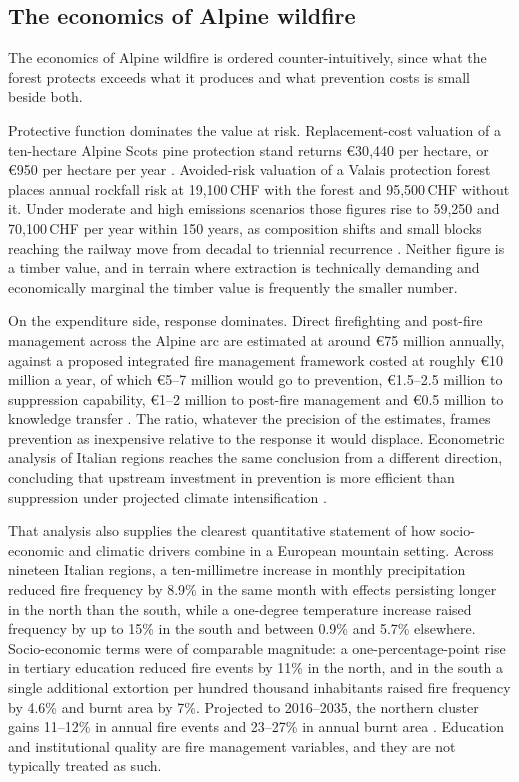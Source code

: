 \documentclass[11pt,a4paper]{article}
\begin{document}
\subsection{The economics of Alpine wildfire}
\label{sec:economics}

The economics of Alpine wildfire is ordered counter-intuitively, since what the forest protects exceeds what it produces and what prevention costs is small beside both.

Protective function dominates the value at risk. Replacement-cost valuation of a ten-hectare Alpine Scots pine protection stand returns €30{,}440 per hectare, or €950 per hectare per year \citep{accastello_asforesee_2019}. Avoided-risk valuation of a Valais protection forest places annual rockfall risk at 19{,}100\,CHF with the forest and 95{,}500\,CHF without it. Under moderate and high emissions scenarios those figures rise to 59{,}250 and 70{,}100\,CHF per year within 150 years, as composition shifts and small blocks reaching the railway move from decadal to triennial recurrence \citep{moos_climate_2021}. Neither figure is a timber value, and in terrain where extraction is technically demanding and economically marginal \citep{dinca_timber_2025} the timber value is frequently the smaller number.

On the expenditure side, response dominates. Direct firefighting and post-fire management across the Alpine arc are estimated at around €75 million annually, against a proposed integrated fire management framework costed at roughly €10 million a year, of which €5--7 million would go to prevention, €1.5--2.5 million to suppression capability, €1--2 million to post-fire management and €0.5 million to knowledge transfer \citep{muller_forest_2020}. The ratio, whatever the precision of the estimates, frames prevention as inexpensive relative to the response it would displace. Econometric analysis of Italian regions reaches the same conclusion from a different direction, concluding that upstream investment in prevention is more efficient than suppression under projected climate intensification \citep{michetti_forest_2019}.

That analysis also supplies the clearest quantitative statement of how socio-economic and climatic drivers combine in a European mountain setting. Across nineteen Italian regions, a ten-millimetre increase in monthly precipitation reduced fire frequency by 8.9\% in the same month with effects persisting longer in the north than the south, while a one-degree temperature increase raised frequency by up to 15\% in the south and between 0.9\% and 5.7\% elsewhere. Socio-economic terms were of comparable magnitude: a one-percentage-point rise in tertiary education reduced fire events by 11\% in the north, and in the south a single additional extortion per hundred thousand inhabitants raised fire frequency by 4.6\% and burnt area by 7\%. Projected to 2016--2035, the northern cluster gains 11--12\% in annual fire events and 23--27\% in annual burnt area \citep{michetti_forest_2019}. Education and institutional quality are fire management variables, and they are not typically treated as such.
\end{document}
